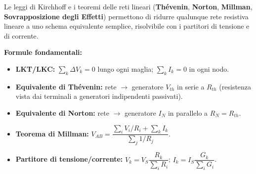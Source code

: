 \begin{important}
Le leggi di Kirchhoff e i teoremi delle reti lineari (\textbf{Thévenin}, \textbf{Norton}, \textbf{Millman}, \textbf{Sovrapposizione degli Effetti}) permettono di ridurre qualunque rete resistiva lineare a uno schema equivalente semplice, risolvibile con i partitori di tensione e di corrente.
\end{important}

\begin{note}
\textbf{Formule fondamentali:}
\begin{itemize}
    \item \textbf{LKT/LKC:} $\sum_k \Delta V_k = 0$ lungo ogni maglia; $\sum_k I_k = 0$ in ogni nodo.
    \item \textbf{Equivalente di Thévenin:} rete $\to$ generatore $V_{th}$ in serie a $R_{th}$ (resistenza vista dai terminali a generatori indipendenti passivati).
    \item \textbf{Equivalente di Norton:} rete $\to$ generatore $I_N$ in parallelo a $R_N = R_{th}$.
    \item \textbf{Teorema di Millman:} $V_{AB} = \dfrac{\sum_i V_i/R_i + \sum_k I_k}{\sum_j 1/R_j}$.
    \item \textbf{Partitore di tensione/corrente:} $V_k = V_S \dfrac{R_k}{\sum_i R_i}$; $I_k = I_S \dfrac{G_k}{\sum_i G_i}$.
\end{itemize}
\end{note}

